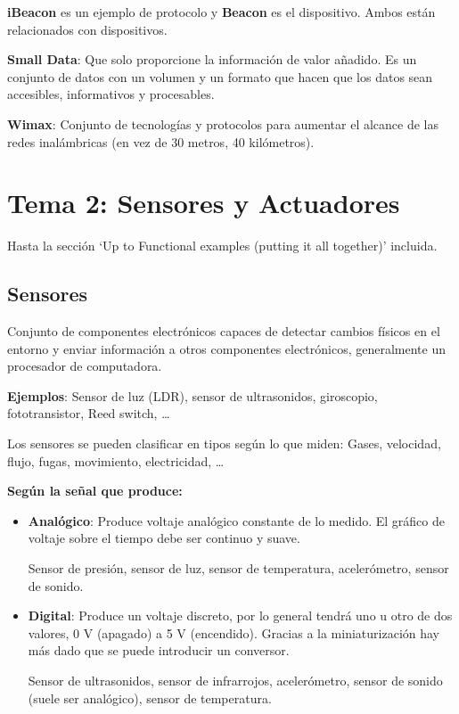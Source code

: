 \documentclass[12pt, twoside, openright]{report} %
\begin{document}
\textbf{iBeacon} es un ejemplo de protocolo y \textbf{Beacon} es el
dispositivo. Ambos están relacionados con dispositivos.

\textbf{Small Data}: Que solo proporcione la información de valor
añadido. Es un conjunto de datos con un volumen y un formato que hacen
que los datos sean accesibles, informativos y procesables.

\textbf{Wimax}: Conjunto de tecnologías y protocolos para aumentar el
alcance de las redes inalámbricas (en vez de 30 metros, 40 kilómetros).

\chapter{Tema 2: Sensores y
  Actuadores}


Hasta la sección `Up to Functional examples
(putting it all together)' incluida.

\section{Sensores}

Conjunto de componentes electrónicos capaces de detectar cambios físicos
en el entorno y enviar información a otros componentes electrónicos,
generalmente un procesador de computadora.

\textbf{Ejemplos}: Sensor de luz (LDR), sensor de ultrasonidos,
giroscopio, fototransistor, Reed switch, \ldots{}

Los sensores se pueden clasificar en tipos según lo que miden: Gases,
velocidad, flujo, fugas, movimiento, electricidad, \ldots{}

\textbf{Según la señal que produce:}

\begin{itemize}
	\item \textbf{Analógico}: Produce voltaje analógico constante de lo medido.
	      El gráfico de voltaje sobre el tiempo debe ser continuo y suave.

	      Sensor de presión, sensor de luz, sensor de temperatura,
	      acelerómetro, sensor de sonido.
	\item \textbf{Digital}: Produce un voltaje discreto, por lo general tendrá
	      uno u otro de dos valores, 0 V (apagado) a 5 V (encendido). Gracias a la
	      miniaturización hay más dado que se puede introducir un conversor.

	      Sensor de ultrasonidos, sensor de infrarrojos, acelerómetro, sensor
	      de sonido (suele ser analógico), sensor de temperatura.
\end{itemize}
\end{document}
